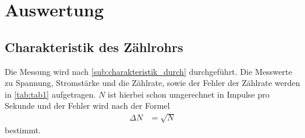 \section{Auswertung}
\label{sec:Auswertung}
\subsection{Charakteristik des Zählrohrs} %
\label{sub:charakteristik_aus}

Die Messung wird nach \autoref{sub:charakteristik_durch} durchgeführt. Die Messwerte zu Spannung, Stromstärke und die Zählrate, sowie der Fehler
der Zählrate werden in
\autoref{tab:tab1} aufgetragen.
$N$ ist hierbei schon umgerechnet in Impulse pro Sekunde und der Fehler wird nach der Formel
\begin{align*}
  \Delta N &= \sqrt{N} 
\end{align*}
bestimmt.

